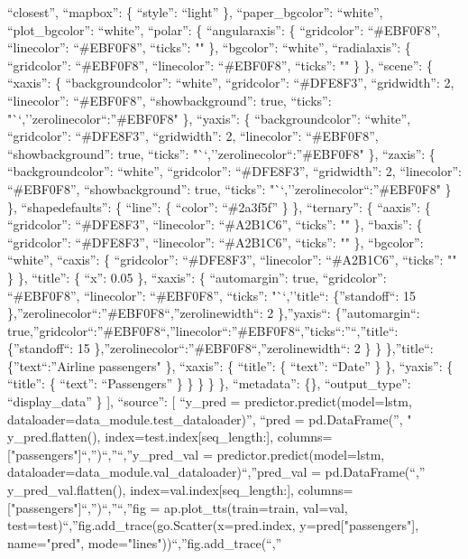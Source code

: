 \documentclass[
]{article}
\begin{document}
``closest'', ``mapbox'': \{ ``style'': ``light'' \}, ``paper\_bgcolor'':
``white'', ``plot\_bgcolor'': ``white'', ``polar'': \{ ``angularaxis'':
\{ ``gridcolor'': ``\#EBF0F8'', ``linecolor'': ``\#EBF0F8'', ``ticks'':
"" \}, ``bgcolor'': ``white'', ``radialaxis'': \{ ``gridcolor'':
``\#EBF0F8'', ``linecolor'': ``\#EBF0F8'', ``ticks'': "" \} \},
``scene'': \{ ``xaxis'': \{ ``backgroundcolor'': ``white'',
``gridcolor'': ``\#DFE8F3'', ``gridwidth'': 2, ``linecolor'':
``\#EBF0F8'', ``showbackground'': true, ``ticks'':
"``,''zerolinecolor``:''\#EBF0F8" \}, ``yaxis'': \{ ``backgroundcolor'':
``white'', ``gridcolor'': ``\#DFE8F3'', ``gridwidth'': 2, ``linecolor'':
``\#EBF0F8'', ``showbackground'': true, ``ticks'':
"``,''zerolinecolor``:''\#EBF0F8" \}, ``zaxis'': \{ ``backgroundcolor'':
``white'', ``gridcolor'': ``\#DFE8F3'', ``gridwidth'': 2, ``linecolor'':
``\#EBF0F8'', ``showbackground'': true, ``ticks'':
"``,''zerolinecolor``:''\#EBF0F8" \} \}, ``shapedefaults'': \{ ``line'':
\{ ``color'': ``\#2a3f5f'' \} \}, ``ternary'': \{ ``aaxis'': \{
``gridcolor'': ``\#DFE8F3'', ``linecolor'': ``\#A2B1C6'', ``ticks'': ""
\}, ``baxis'': \{ ``gridcolor'': ``\#DFE8F3'', ``linecolor'':
``\#A2B1C6'', ``ticks'': "" \}, ``bgcolor'': ``white'', ``caxis'': \{
``gridcolor'': ``\#DFE8F3'', ``linecolor'': ``\#A2B1C6'', ``ticks'': ""
\} \}, ``title'': \{ ``x'': 0.05 \}, ``xaxis'': \{ ``automargin'': true,
``gridcolor'': ``\#EBF0F8'', ``linecolor'': ``\#EBF0F8'', ``ticks'':
"``,''title``: \{''standoff``: 15
\},''zerolinecolor``:''\#EBF0F8``,''zerolinewidth``: 2 \},''yaxis``:
\{''automargin``:
true,''gridcolor``:''\#EBF0F8``,''linecolor``:''\#EBF0F8``,''ticks``:''``,''title``:
\{''standoff``: 15 \},''zerolinecolor``:''\#EBF0F8``,''zerolinewidth``:
2 \} \} \},''title``: \{''text``:''Airline passengers" \}, ``xaxis'': \{
``title'': \{ ``text'': ``Date'' \} \}, ``yaxis'': \{ ``title'': \{
``text'': ``Passengers'' \} \} \} \} \}, ``metadata'': \{\},
``output\_type'': ``display\_data'' \} {]}, ``source'': {[} ``y\_pred =
predictor.predict(model=lstm,
dataloader=data\_module.test\_dataloader)\n'', ``pred =
pd.DataFrame(\n'', " y\_pred.flatten(),
index=test.index{[}seq\_length:{]},
columns={[}"passengers"{]}\n``,'')\n``,''\n``,''y\_pred\_val =
predictor.predict(model=lstm,
dataloader=data\_module.val\_dataloader)\n``,''pred\_val =
pd.DataFrame(\n``,'' y\_pred\_val.flatten(),
index=val.index{[}seq\_length:{]},
columns={[}"passengers"{]}\n``,'')\n``,''\n``,''fig =
ap.plot\_tts(train=train, val=val,
test=test)\n``,''fig.add\_trace(go.Scatter(x=pred.index,
y=pred{[}"passengers"{]}, name="pred",
mode="lines"))\n``,''fig.add\_trace(\n``,''
\end{document}
